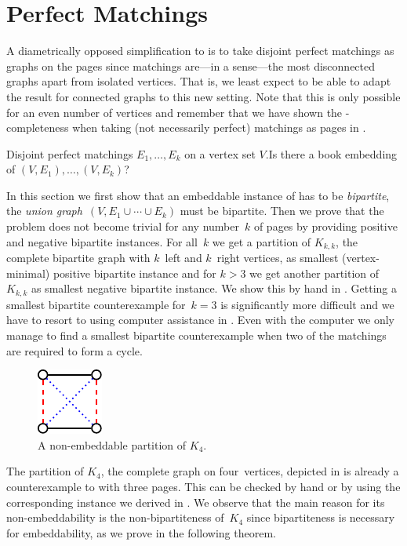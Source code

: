 \section{Perfect Matchings}\label{section:matchings}

A diametrically opposed simplification to  is to take disjoint
perfect matchings as graphs on the pages since matchings are---in a sense---the most disconnected graphs apart
from isolated vertices.
That is, we least expect to be able to adapt the result for connected graphs to this new setting.
Note that this is only possible for an even number of vertices and remember that we
have shown the \NP-completeness when taking (not necessarily perfect) matchings as pages in .

\newProb{\probMatching}
{Disjoint perfect matchings $E_1,\dotsc, E_k$ on a vertex
set $V$.}{Is there a book embedding of $(V, E_1),\dotsc, (V, E_k)$?}

In this section we first show that an embeddable instance of \probMatching has to be
\emph{bipartite}, \ie the \emph{union graph}~$(V, E_1\cup\dotsb\cup E_k)$ must be bipartite. Then we prove that the problem does not become trivial for any number~$k$ of pages
by providing positive and negative bipartite instances.
For all~$k$ we get a partition of $K_{k,k}$, the complete bipartite graph with $k$~left and $k$~right vertices, as smallest (vertex-minimal) positive bipartite instance and
for $k > 3$ we get another partition of~$K_{k,k}$ as smallest negative bipartite instance.
We show this by hand in . Getting a smallest bipartite counterexample
for~$k = 3$ is significantly more difficult and we have to resort to using computer assistance in
. Even with the computer we only manage to find a smallest
bipartite counterexample when two of the matchings are required to form a cycle.

\begin{figure}[\placement]\centering
    \includegraphics[scale=2.0]{figures/t_k4}
    \caption[$K_4$ is not embeddable]{A non-embeddable partition of $K_4$.}
    \label{figure:k4}
\end{figure}

The partition of $K_4$, the complete graph on four~vertices, depicted in  is already a counterexample to \probMatching with three pages.
This can be checked by hand or by using the corresponding \probThreeSat instance we derived
in . We observe that the main reason for its non-embeddability is
the non-bipartiteness of~$K_4$ since bipartiteness is necessary for embeddability,
as we prove in the following theorem.

